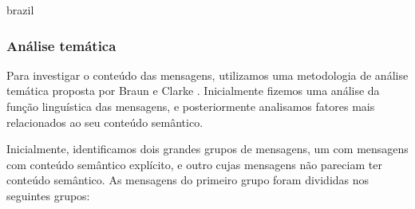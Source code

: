 \begin{otherlanguage*}{brazil}

\subsubsection{Análise temática}
\label{sec:thematic}

Para investigar o conteúdo das mensagens, utilizamos uma metodologia de análise temática proposta por Braun e Clarke \cite{Braun2006}. Inicialmente fizemos uma análise da função linguística das mensagens, e posteriormente analisamos fatores mais relacionados ao seu conteúdo semântico.



Inicialmente, identificamos dois grandes grupos de mensagens, um com mensagens com conteúdo semântico explícito, e outro cujas mensagens não pareciam ter conteúdo semântico. As mensagens do primeiro grupo foram divididas nos seguintes grupos:



\end{otherlanguage*}
